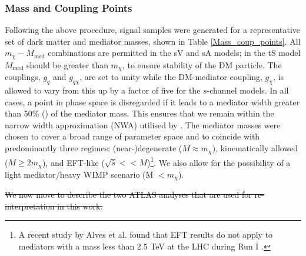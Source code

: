 \subsubsection{Mass and Coupling Points}
Following the above procedure, signal samples were generated for a representative set of dark matter and mediator masses, shown in Table \ref{Mass_coup_points}. All $m_{\chi}-M_{\mathrm{med}}$ combinations are permitted in the sV and sA models; in the tS model $M_{\mathrm{med}}$ should be greater than $m_{\chi}$, to ensure stability of the DM particle. The couplings, $g_{q}$ and $g_{q\chi}$, are set to unity while the DM-mediator coupling, $g_{\chi}$, is allowed to vary from this up by a factor of five for the $s$-channel models. In all cases, a point in phase space is disregarded if it leads to a mediator width greater than 50\% () of the mediator mass. This ensures that we remain within the narrow width approximation (NWA) utilised by \MG. The mediator masses were chosen to cover a broad range of parameter space and to coincide with predominantly three regimes: (near-)degenerate ($M\approx m_{\chi}$), kinematically allowed ($M \geq 2m_{\chi}$), and EFT-like ($\sqrt{\hat{s}} << M$)\footnote{A recent study by Alves et al. found that EFT results do not apply to mediators with a mass less than 2.5 TeV at the LHC during Run I \cite{Alves:2011wf}.}. We also allow for the possibility of a light mediator/heavy WIMP scenario (M $<m_{\chi}$).

\st{We now move to describe the two ATLAS analyses that are used for re-interpretation in this work.}

